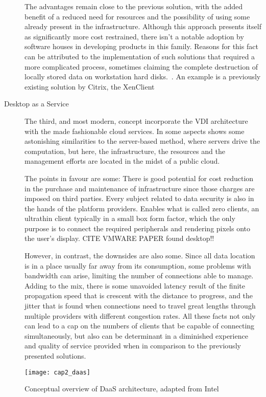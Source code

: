 \begin{description}
		The advantages remain close to the previous solution, with the added benefit of a reduced need for resources and the possibility of using some already present in the infrastructure. Although this approach presents itself as significantly more cost restrained, there isn't a notable adoption by software houses in developing products in this family. Reasons for this fact can be attributed to the implementation of such solutions that required a more complicated process, sometimes claiming the complete destruction of locally stored data on workstation hard disks.~\cite{VMblog_Citrix}. An example is a previously existing solution by Citrix, the XenClient~\cite{Citrix_XenDesktop}
	\item [Desktop as a Service] The third, and most modern, concept incorporate the VDI architecture with the made fashionable cloud services. In some aspects shows some astonishing similarities to the server-based method, where servers drive the computation, but here, the infrastructure, the resources and the management efforts are located in the midst of a public cloud.

		The points in favour are some: There is good potential for cost reduction in the purchase and maintenance of infrastructure since those charges are imposed on third parties. Every subject related to data security is also in the hands of the platform providers. Enables what is called zero clients, an ultrathin client typically in a small box form factor, which the only purpose is to connect the required peripherals and rendering pixels onto the user’s display. CITE VMWARE PAPER found desktop!!

		However, in contrast, the downsides are also some. Since all data location is in a place usually far away from its consumption, some problems with bandwidth can arise, limiting the number of connections able to manage. Adding to the mix, there is some unavoided latency result of the finite propagation speed that is crescent with the distance to progress, and the jitter that is found when connections need to travel great lengths through multiple providers with different congestion rates.
		All these facts not only can lead to a cap on the numbers of clients that be capable of connecting simultaneously, but also can be determinant in a diminished experience and quality of service provided when in comparison to the previously presented solutions.
\end{description}


\begin{figure}[htbp]
	\centering
	\texttt{[image: cap2\_daas]}
	\caption{Conceptual overview of DaaS architecture, adapted from Intel~\cite{Jain2014}}
	\label{fig:daas}
\end{figure}


